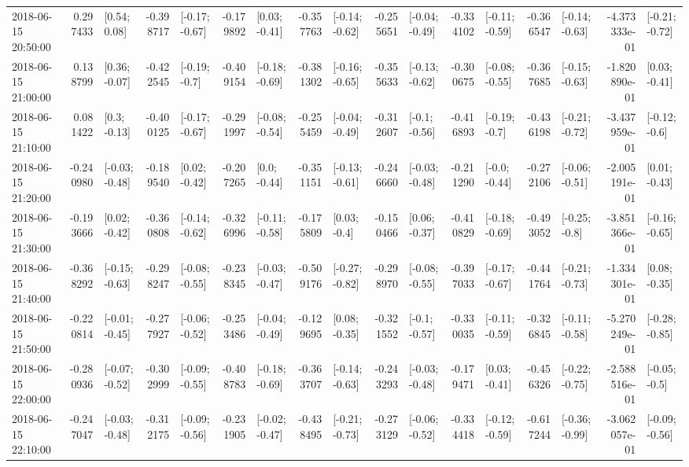 \begin{tabular}{lrlrlrlrlrlrlrlrl}
2018-06-15 20:50:00 &  0.297433 &    [0.54; 0.08] & -0.398717 &  [-0.17; -0.67] & -0.179892 &   [0.03; -0.41] & -0.357763 &  [-0.14; -0.62] & -0.255651 &  [-0.04; -0.49] & -0.334102 &  [-0.11; -0.59] & -0.366547 &  [-0.14; -0.63] & -4.373333e-01 &  [-0.21; -0.72] \\
2018-06-15 21:00:00 &  0.138799 &   [0.36; -0.07] & -0.422545 &   [-0.19; -0.7] & -0.409154 &  [-0.18; -0.69] & -0.381302 &  [-0.16; -0.65] & -0.355633 &  [-0.13; -0.62] & -0.300675 &  [-0.08; -0.55] & -0.367685 &  [-0.15; -0.63] & -1.820890e-01 &   [0.03; -0.41] \\
2018-06-15 21:10:00 &  0.081422 &    [0.3; -0.13] & -0.400125 &  [-0.17; -0.67] & -0.291997 &  [-0.08; -0.54] & -0.255459 &  [-0.04; -0.49] & -0.312607 &   [-0.1; -0.56] & -0.416893 &   [-0.19; -0.7] & -0.436198 &  [-0.21; -0.72] & -3.437959e-01 &   [-0.12; -0.6] \\
2018-06-15 21:20:00 & -0.240980 &  [-0.03; -0.48] & -0.189540 &   [0.02; -0.42] & -0.207265 &    [0.0; -0.44] & -0.351151 &  [-0.13; -0.61] & -0.246660 &  [-0.03; -0.48] & -0.211290 &   [-0.0; -0.44] & -0.272106 &  [-0.06; -0.51] & -2.005191e-01 &   [0.01; -0.43] \\
2018-06-15 21:30:00 & -0.193666 &   [0.02; -0.42] & -0.360808 &  [-0.14; -0.62] & -0.326996 &  [-0.11; -0.58] & -0.175809 &    [0.03; -0.4] & -0.150466 &   [0.06; -0.37] & -0.410829 &  [-0.18; -0.69] & -0.493052 &   [-0.25; -0.8] & -3.851366e-01 &  [-0.16; -0.65] \\
2018-06-15 21:40:00 & -0.368292 &  [-0.15; -0.63] & -0.298247 &  [-0.08; -0.55] & -0.238345 &  [-0.03; -0.47] & -0.509176 &  [-0.27; -0.82] & -0.298970 &  [-0.08; -0.55] & -0.397033 &  [-0.17; -0.67] & -0.441764 &  [-0.21; -0.73] & -1.334301e-01 &   [0.08; -0.35] \\
2018-06-15 21:50:00 & -0.220814 &  [-0.01; -0.45] & -0.277927 &  [-0.06; -0.52] & -0.253486 &  [-0.04; -0.49] & -0.129695 &   [0.08; -0.35] & -0.321552 &   [-0.1; -0.57] & -0.330035 &  [-0.11; -0.59] & -0.326845 &  [-0.11; -0.58] & -5.270249e-01 &  [-0.28; -0.85] \\
2018-06-15 22:00:00 & -0.280936 &  [-0.07; -0.52] & -0.302999 &  [-0.09; -0.55] & -0.408783 &  [-0.18; -0.69] & -0.363707 &  [-0.14; -0.63] & -0.243293 &  [-0.03; -0.48] & -0.179471 &   [0.03; -0.41] & -0.456326 &  [-0.22; -0.75] & -2.588516e-01 &   [-0.05; -0.5] \\
2018-06-15 22:10:00 & -0.247047 &  [-0.03; -0.48] & -0.312175 &  [-0.09; -0.56] & -0.231905 &  [-0.02; -0.47] & -0.438495 &  [-0.21; -0.73] & -0.273129 &  [-0.06; -0.52] & -0.334418 &  [-0.12; -0.59] & -0.617244 &  [-0.36; -0.99] & -3.062057e-01 &  [-0.09; -0.56] \\

\end{tabular}
